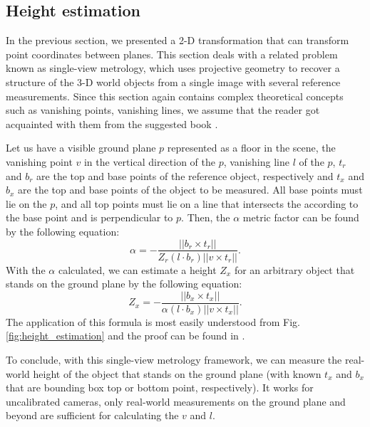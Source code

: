         \subsection{Height estimation}
            In the previous section, we presented a 2-D transformation that can transform point coordinates between planes. This section deals with a related problem known as single-view metrology, which uses projective geometry to recover a structure of the 3-D world objects from a single image with several reference measurements. Since this section again contains complex theoretical concepts such as vanishing points, vanishing lines, we assume that the reader got acquainted with them from the suggested book \cite{hartley2003multiple}.
            
            Let us have a visible ground plane $p$ represented as a floor in the scene, the vanishing point $v$ in the vertical direction of the $p$, vanishing line $l$ of the $p$, $t_r$ and $b_r$ are the top and base points of the reference object, respectively and $t_x$ and $b_x$ are the top and base points of the object to be measured. All base points must lie on the $p$, and all top points must lie on a line that intersects the according to the base point and is perpendicular to $p$. Then, the $\alpha$ metric factor can be found by the following equation:
            \begin{equation}\label{height_equation_1}
                \alpha = - \frac{|| b_r \times t_r ||}{Z_r (l \cdot b_r) || v \times  t_r|| }.
            \end{equation}
            With the $\alpha$ calculated, we can estimate a height $Z_x$ for an arbitrary object that stands on the ground plane by the following equation:
            \begin{equation}\label{height_equation_2}
                  Z_x = - \frac{|| b_x \times t_x ||}{\alpha (l \cdot b_x) || v \times  t_x|| }.
            \end{equation}
            The application of this formula is most easily understood from Fig. \ref{fig:height_estimation} and the proof can be found in \cite{criminisi2002single}.
            
            To conclude, with this single-view metrology framework, we can measure the real-world height of the object that stands on the ground plane (with known $t_x$ and $b_x$ that are bounding box top or bottom point, respectively). It works for uncalibrated cameras, only real-world measurements on the ground plane and beyond are sufficient for calculating the $v$ and $l$. 

